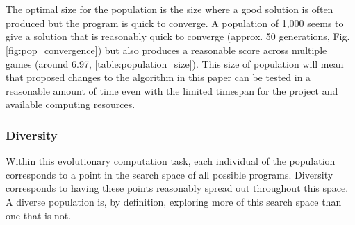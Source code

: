 \documentclass{article}
\begin{document}
\\\\
The optimal size for the population is the size where a good solution is often produced but the program is quick to converge\cite{optimal_population_size}. A population of 1,000 seems to give a solution that is reasonably quick to converge (approx. 50 generations, Fig. \ref{fig:pop_convergence}) but also produces a reasonable score across multiple games (around 6.97, \ref{table:population_size}). This size of population will mean that proposed changes to the algorithm in this paper can be tested in a reasonable amount of time even with the limited timespan for the project and available computing resources.

\subsubsection{Diversity}
Within this evolutionary computation task, each individual of the population corresponds to a point in the search space of all possible programs. %
Diversity corresponds to having these points reasonably spread out throughout this space. A diverse population is, by definition, exploring more of this search space than one that is not. %
\end{document}
